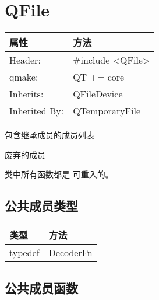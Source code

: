 \chapter{QFile}

\begin{tabular}{|l|l|}
\hline
属性 	&方法\\
\hline
Header: &	\#include <QFile>\\
\hline
qmake: &	QT += core\\
\hline
Inherits: &	QFileDevice\\
\hline
Inherited By:& 	QTemporaryFile\\
\hline
\end{tabular}

\begin{compactitem}
\item 包含继承成员的成员列表
\item 废弃的成员
\end{compactitem}

\begin{notice}
	类中所有函数都是 可重入的。
\end{notice}
 
\splitLine

\section{公共成员类型}

\begin{tabular}{|l|l|}
\hline
类型& 	方法\\
\hline
typedef& 	DecoderFn \\
\hline
\end{tabular}

\splitLine

\section{公共成员函数}

